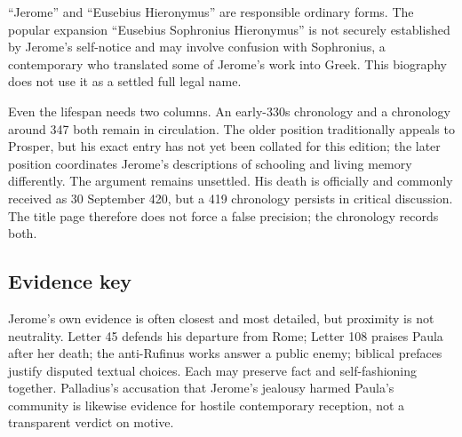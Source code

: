 “Jerome” and “Eusebius Hieronymus” are responsible ordinary forms.
The popular expansion “Eusebius Sophronius Hieronymus” is not securely
established by Jerome's self-notice and may involve confusion with Sophronius,
a contemporary who translated some of Jerome's work into Greek. This
biography does not use it as a settled full legal name.

Even the lifespan needs two columns. An early-330s chronology and a chronology
around 347 both remain in circulation. The older position traditionally
appeals to Prosper, but his exact entry has not yet been collated for this
edition; the later position coordinates Jerome's descriptions of schooling and
living memory differently. The argument remains unsettled. His death is
officially and commonly received as 30 September 420,
but a 419 chronology persists in critical discussion. The title page therefore
does not force a false precision; the chronology records both.

\subsection{Evidence key}

\begin{evidencelegend}
\end{evidencelegend}

Jerome's own evidence is often closest and most detailed, but proximity is not
neutrality. Letter 45 defends his departure from Rome; Letter 108 praises Paula
after her death; the anti-Rufinus works answer a public enemy; biblical
prefaces justify disputed textual choices. Each may preserve fact and
self-fashioning together. Palladius's accusation that Jerome's jealousy harmed
Paula's community is likewise evidence for hostile contemporary reception,
not a transparent verdict on motive.

